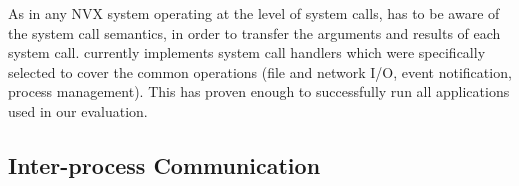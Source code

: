 As in any NVX system operating at the level of system calls, \nx has
to be aware of the system call semantics, in order to transfer the
arguments and results of each system call.  \nx currently implements
\syscallsHandlers system call handlers which were specifically selected
to cover the common operations (file and network I/O, event
notification, process management). This has proven enough to
successfully run all applications used in our evaluation.







\subsection{Inter-process Communication}
\label{sec:ipc}


